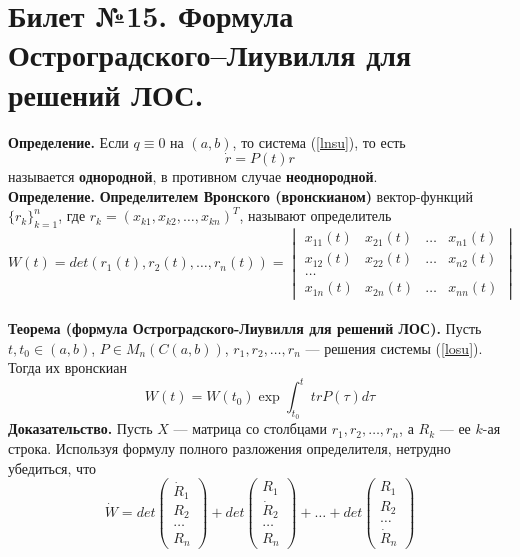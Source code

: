 \documentclass{article}
\begin{document}
\section{Билет №15. Формула Остроградского–Лиувилля для решений ЛОС.}
\textbf{Определение.} Если $q \equiv 0$ на $(a,b)$, то система (\ref{lnsu}), то есть
\begin{equation}
    \dot{r} = P(t)r \label{losu}
\end{equation}
называется \textbf{однородной}, в противном случае \textbf{неоднородной}.\\

\noindent \textbf{Определение.} \textbf{Определителем Вронского (вронскианом)} вектор-функций $\{r_k\}_{k=1}^n$, где $r_k=(x_{k1}, x_{k2}, \ldots, x_{kn})^T$, называют определитель
\begin{equation*}
    W(t) = det(r_1(t),r_2(t),\ldots, r_n(t)) = \begin{vmatrix}
    x_{11}(t) & x_{21}(t) & \ldots & x_{n1}(t)\\
    x_{12}(t) & x_{22}(t) & \ldots & x_{n2}(t)\\
    \ldots\\
    x_{1n}(t) & x_{2n}(t) & \ldots & x_{nn}(t)
    \end{vmatrix}
\end{equation*}
\\
\noindent \textbf{Теорема (формула Остроградского-Лиувилля для решений ЛОС).} Пусть $t, t_0 \in (a,b)$, $P \in M_n(C(a,b))$, $r_1, r_2, \ldots, r_n$ --- решения системы (\ref{losu}). Тогда их вронскиан
\begin{equation*}
    W(t) = W(t_0)\exp \int_{t_0}^t trP(\tau)d\tau
\end{equation*}
\textbf{Доказательство.} Пусть $X$ --- матрица со столбцами $r_1, r_2, \ldots, r_n$, а $R_k$ --- ее $k$-ая строка. Используя формулу полного разложения определителя, нетрудно убедиться, что
\begin{equation*}
    \dot{W} = det\begin{pmatrix}
    \dot{R}_1\\
    R_2\\
    \ldots\\
    R_n
    \end{pmatrix} + det\begin{pmatrix}
    R_1\\
    \dot{R}_2\\
    \ldots\\
    R_n
    \end{pmatrix} + \ldots + det\begin{pmatrix}
    R_1\\
    R_2\\
    \ldots\\
    \dot{R}_n
    \end{pmatrix}
\end{equation*}
\end{document}
